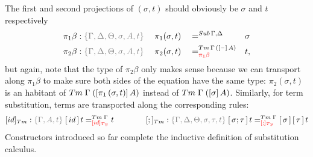 \documentclass[a4paper,UKenglish,numberwithinsect,cleveref,thm-restate]{lipics-v2021}
\begin{document}

The first and second projections of $(\sigma, t)$ should obviously be $\sigma$ and $t$ respectively
\begin{alignat*}{5}
  \pi_1\beta      & : \implicit{\Gamma, \Delta, \Theta, \sigma, A, t}\; && \pi_1(\sigma , t)        && =^{\Sub\,\Gamma,\Delta} &&  \sigma \\
  \pi_2\beta      & : \implicit{\Gamma, \Delta, \Theta, \sigma, A, t}\; && \pi_2(\sigma , t)        && =^{\Tm\,\Gamma\,([\blank]\,A)}_{\alert{\pi_1\beta}} &&  t, 
\end{alignat*}
but again, note that the type of $\pi_2\beta$ only makes sense because we can transport along $\pi_1\beta$ to make sure both sides of the equation have the same type: $\pi_2(\sigma, t)$ is an habitant of $\Tm\;\Gamma\;([\pi_1\,(\sigma, t)]\,A)$ instead of $\Tm\;\Gamma\;([\sigma]\,A)$.
%
Similarly, for term substitution, terms are transported along the corresponding rules:
\[
  [\idS]_{\Tm} : \implicit{\Gamma, A, t}\; {[\,\idS\,]\,t} =^{\Tm\;\Gamma}_{\alert{[\idS]_\Ty}} t
  \qquad\qquad
  [;]_{\Tm}    : \implicit{\Gamma, \Delta, \Theta, \sigma, \tau, t}\; {[\,\sigma ; \tau\,]\,t} =^{\Tm\;\Gamma}_{\alert{[;]_{\Ty}}}{[\, \sigma\,]\,[\,\tau\,]\,t}
\]
Constructors introduced so far complete the inductive definition of substitution calculus.
\end{document}
